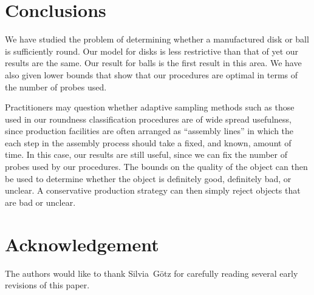 \documentclass[11pt]{article}
\begin{document}
\section{Conclusions}

We have studied the problem of determining whether a manufactured disk
or ball is sufficiently round.  Our model for disks is less
restrictive than that of \cite{msy97,sy95} yet our results are the
same.  Our result for balls is the first result in this area.  We have
also given lower bounds that show that our procedures are optimal in
terms of the number of probes used.

Practitioners may question whether adaptive sampling methods such as
those used in our roundness classification procedures are of wide
spread usefulness, since production facilities are often arranged as
``assembly lines'' in which the each step in the assembly process
should take a fixed, and known, amount of time.  In this case, our
results are still useful, since we can fix the number of probes used
by our procedures.  The bounds on the quality of the object can then
be used to determine whether the object is definitely good, definitely
bad, or unclear.  A conservative production strategy can then simply
reject objects that are bad or unclear.

\section*{Acknowledgement}

The authors would like to thank Silvia~G\"otz for carefully reading
several early revisions of this paper.



\end{document}
